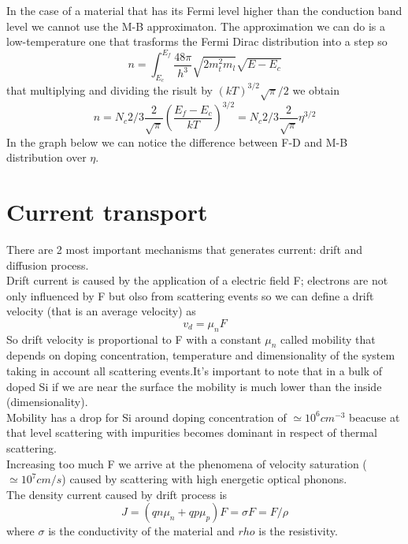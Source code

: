 In the case of a material that has its Fermi level higher than the conduction band level we cannot use the M-B approximaton. The approximation we can do is a low-temperature one that trasforms the Fermi Dirac distribution into a step so
\begin{equation}
n=\int^{E_f}_{E_c}\frac{48\pi}{h^3}\sqrt{2m_t^2m_l}\sqrt{E-E_c}
\end{equation}
that multiplying and dividing the risult by $(kT)^{3/2}\sqrt{\pi}/2$ we obtain
\begin{equation}
n=N_c 2/3 \frac{2}{\sqrt{\pi}}\left(\frac{E_f-E_c}{kT}\right)^{3/2}=N_c 2/3 \frac{2}{\sqrt{\pi}}\eta^{3/2}
\end{equation}
In the graph below we can notice the difference between F-D and M-B distribution over $\eta$.\\
\section{Current transport}
There are 2 most important mechanisms that generates current: drift and diffusion process.\\
Drift current is caused by the application of a electric field F; electrons are not only influenced by F but olso from scattering events so we can define a drift velocity (that is an average velocity) as 
\begin{equation}
v_d=\mu_n F
\end{equation}
So drift velocity is proportional to F with a constant $\mu_n$ called mobility that depends on doping concentration, temperature and dimensionality of the system taking in account all scattering events.It's important to note that in a bulk of doped Si if we are near the surface the mobility is much lower than the inside (dimensionality).\\
Mobility has a drop for Si around doping concentration of $\simeq 10^6 cm^{-3}$ beacuse at that level scattering with impurities becomes dominant in respect of thermal scattering.\\
Increasing too much F we arrive at the phenomena of velocity saturation ($\simeq 10^7 cm/s$) caused by scattering with high energetic optical phonons.\\
The density current caused by drift process is 
\begin{equation}
J=(qn\mu_n + qp\mu_p)F=\sigma F=F/\rho
\end{equation}
where $\sigma$ is the conductivity of the material and $rho$ is the resistivity.\\

